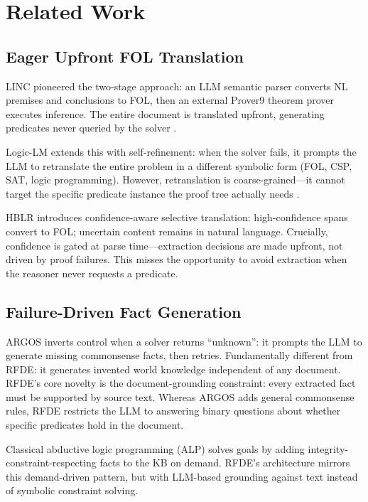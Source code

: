 \documentclass[11pt,letterpaper]{article}
\begin{document}
\section{Related Work}

\subsection{Eager Upfront FOL Translation}

LINC \citep{Olausson2023} pioneered the two-stage approach: an LLM semantic parser converts NL premises and conclusions to
FOL, then an external Prover9 theorem prover executes inference. The entire document is translated upfront, generating
predicates never queried by the solver \citep{Olausson2023}.

Logic-LM \citep{Pan2023} extends this with self-refinement: when the solver fails, it prompts the LLM to retranslate the
entire problem in a different symbolic form (FOL, CSP, SAT, logic programming). However, retranslation is
coarse-grained---it cannot target the specific predicate instance the proof tree actually needs \citep{Pan2023}.

HBLR \citep{Li2025} introduces confidence-aware selective translation: high-confidence spans convert to FOL; uncertain content
remains in natural language. Crucially, confidence is gated at parse time---extraction decisions are made upfront, not driven
by proof failures. This misses the opportunity to avoid extraction when the reasoner never requests a predicate.

\subsection{Failure-Driven Fact Generation}

ARGOS \citep{Zheng2024} inverts control when a solver returns ``unknown'': it prompts the LLM to generate missing commonsense
facts, then retries. Fundamentally different from RFDE: it generates invented world knowledge independent of any document.
RFDE's core novelty is the document-grounding constraint: every extracted fact must be supported by source text. Whereas
ARGOS adds general commonsense rules, RFDE restricts the LLM to answering binary questions about whether specific predicates
hold in the document.

Classical abductive logic programming (ALP) \citep{Kakas1992} solves goals by adding integrity-constraint-respecting facts to
the KB on demand. RFDE's architecture mirrors this demand-driven pattern, but with LLM-based grounding against text instead
of symbolic constraint solving.
\end{document}
